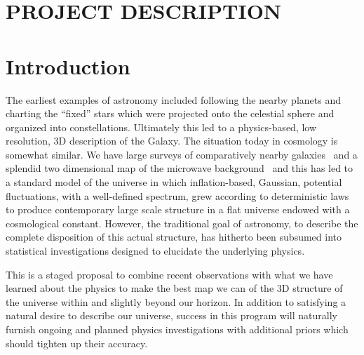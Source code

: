 \documentclass[psfig,11pt]{article}
\def\ni{\noindent}
\begin{document}
\section*{PROJECT DESCRIPTION}


\section{Introduction}
\ni{\bf Mapping Our Universe:}
The earliest examples of astronomy included following the nearby planets and charting the ``fixed'' stars which were projected onto the celestial sphere and organized into constellations. Ultimately this led to a physics-based, low resolution,  3D description of the Galaxy. The situation today in cosmology is somewhat similar. We have large surveys of comparatively nearby galaxies~\cite{Kaiser2002, Ivezc2002, Davis2003, Giavalisco2004, DES2005, %
Skrutskie2006, Faber2007, Scoville2007, Kaiser2010, Blake2011, Alam2015} and a splendid two dimensional map of the microwave background~\cite{Planck2015maps} and this has led to a standard model of the universe in which inflation-based, Gaussian, potential fluctuations, with a well-defined spectrum, grew according to deterministic laws to produce contemporary large scale structure in a flat universe endowed with a cosmological constant. However, the traditional goal of astronomy, to describe the complete disposition of this actual structure, has hitherto been subsumed into statistical investigations designed to elucidate the underlying physics.

This is a staged proposal to combine recent observations with what we have learned about the physics to make the best map we can of the 3D structure of the universe within and slightly beyond our horizon. In addition to satisfying a natural desire to describe our universe, success in this program will naturally furnish ongoing and planned physics investigations with additional priors which should tighten up their accuracy.
\end{document}
